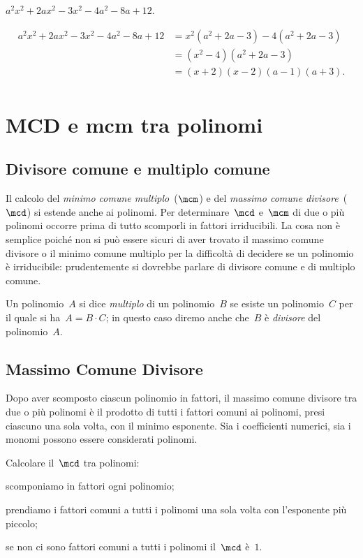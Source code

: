 \begin{exrig}
 \begin{esempio}
 $a^{2}x^{2}+2ax^{2}-3x^{2}-4a^{2}-8a+12$.

 \begin{align*}
  a^{2}x^{2}+2ax^{2}-3x^{2}-4a^{2}-8a+12&=x^{2}\left(a^{2}+2a-3\right)-4\left(a^{2}+2a-3\right)\\
  &=\left(x^{2}-4\right)\left(a^{2}+2a-3\right)\\
  &=(x+2)(x-2)(a-1)(a+3).\\
 \end{align*}
 \end{esempio}
\end{exrig}

\section{MCD e mcm tra polinomi}

\subsection{Divisore comune e multiplo comune}

Il calcolo del \emph{minimo comune multiplo}~($\mcm$) e del \emph{massimo comune divisore}~($\mcd$) si estende anche ai polinomi.
Per determinare~$\mcd$ e~$\mcm$ di due o più polinomi occorre prima di tutto scomporli in fattori irriducibili.
La cosa non è semplice poiché non si può essere sicuri di aver trovato il massimo comune divisore o il minimo comune multiplo
per la difficoltà di decidere se un polinomio è irriducibile: prudentemente si dovrebbe parlare di divisore comune e di multiplo comune.

Un polinomio~$A$ si dice \emph{multiplo} di un polinomio~$B$ se esiste un polinomio~$C$ per il quale si ha~$A=B\cdot C$; in questo caso diremo
anche che~$B$ è \emph{divisore} del polinomio~$A$.

\subsection{Massimo Comune Divisore}
Dopo aver scomposto ciascun polinomio in fattori, il massimo comune divisore tra due o più polinomi è il prodotto di tutti i
fattori comuni ai polinomi, presi ciascuno una sola volta, con il minimo esponente.
Sia i coefficienti numerici, sia i monomi possono essere considerati polinomi.
\begin{procedura}
Calcolare il~$\mcd$ tra polinomi:
\begin{enumeratea}
\item scomponiamo in fattori ogni polinomio;
\item prendiamo i fattori comuni a tutti i polinomi una sola volta con l'esponente più piccolo;
\item se non ci sono fattori comuni a tutti i polinomi il~$\mcd$ è~$1$.
\end{enumeratea}
\end{procedura}

